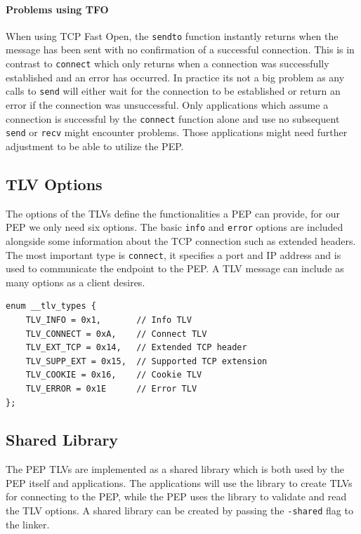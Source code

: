 \documentclass[a4paper,english, 11pt]{report}
\begin{document}
\paragraph{Problems using TFO}
When using TCP Fast Open, the \verb|sendto| function instantly returns when the message has been sent with no confirmation of a successful connection. This is in contrast to \verb|connect| which only returns when a connection was successfully established and an error has occurred. In practice its not a big problem as any calls to \verb|send| will either wait for the connection to be established or return an error if the connection was unsuccessful. Only applications which assume a connection is successful by the \verb|connect| function alone and use no subsequent \verb|send| or \verb|recv| might encounter problems. Those applications might need further adjustment to be able to utilize the PEP.

\subsection{TLV Options}
The options of the TLVs define the functionalities a PEP can provide, for our PEP we only need six options. The basic \verb|info| and \verb|error| options are included alongside some information about the TCP connection such as extended headers. The most important type is \verb|connect|, it specifies a port and IP address and is used to communicate the endpoint to the PEP. A TLV message can include as many options as a client desires.

\begin{verbatim}
enum __tlv_types {
    TLV_INFO = 0x1,    	  // Info TLV
    TLV_CONNECT = 0xA,    // Connect TLV          
    TLV_EXT_TCP = 0x14,   // Extended TCP header
    TLV_SUPP_EXT = 0x15,  // Supported TCP extension
    TLV_COOKIE = 0x16,    // Cookie TLV
    TLV_ERROR = 0x1E      // Error TLV
};
\end{verbatim}

\subsection{Shared Library}
The PEP TLVs are implemented as a shared library which is both used by the PEP itself and applications. The applications will use the library to create TLVs for connecting to the PEP, while the PEP uses the library to validate and read the TLV options. 
A shared library can be created by passing the \verb|-shared| flag to the linker.
\end{document}
